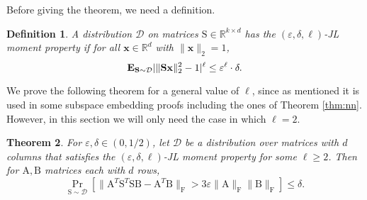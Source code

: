 \documentclass[11pt]{article}
\newcommand{\FNorm }[1]{\mbox{}\|#1\|_\mathrm{F}  }
\newtheorem{theorem}{Theorem}
\newtheorem{definition}[theorem]{Definition}
\newcommand{\mat}[1]{{\ensuremath{\bm{\mathrm{#1}}}}}
\def\matA{\mat{A}}
\def\matB{\mat{B}}
\def\matS{\mat{S}}
\def\x{{\mathbf x}}
\newcommand{\eps}{\varepsilon}
\begin{document}
Before giving the theorem, we need a definition.

\begin{definition}\cite{kn14}\label{def:moment}
A distribution $\mathcal{D}$ on matrices $\matS \in \mathbb{R}^{k \times d}$ has the 
$(\eps, \delta, \ell)$-JL moment property if for all $\x \in \mathbb{R}^d$ with $\|\x\|_2 = 1$,
$${\bf E}_{\matS \sim \mathcal{D}} |\|\matS \x\|_2^2-1|^{\ell} \leq \eps^{\ell} \cdot \delta.$$
\end{definition}

We prove the following theorem for a general value of $\ell$, since as mentioned it is used in some
subspace embedding proofs including the ones of Theorem \ref{thm:nn}. However, in this section we will only
need the case in which $\ell = 2$. 

\begin{theorem}\label{thm:jlamp}\cite{kn14}
For $\eps, \delta \in (0,1/2)$, let $\mathcal{D}$ be a distribution over matrices with $d$ columns
that satisfies the $(\eps, \delta, \ell)$-JL moment property for some $\ell \geq 2$. Then for $\matA, \matB$
matrices each with $d$ rows,
$$\Pr_{\matS \sim \mathcal{D}} \left [\FNorm{\matA^T \matS^T \matS \matB - \matA^T \matB} 
> 3 \eps \FNorm{\matA} \FNorm{\matB} \right ] \leq \delta.$$
\end{theorem}
\end{document}
